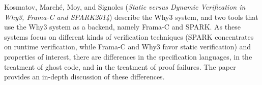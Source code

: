 

Kosmatov, March\'{e}, Moy, and Signoles
\cite{isola-2016-kosmatov}
({\em Static versus Dynamic Verification in 
      Why3, Frama-C and SPARK2014})
describe the Why3 system, and two tools that use the Why3 system as a
backend, namely Frama-C and SPARK. As these systems focus on different
kinds of verification techniques (SPARK concentrates on runtime
verification, while Frama-C and Why3 favor static verification) and
properties of interest, there are differences in the specification
languages, in the treatment of ghost code, and in the treatment of
proof failures. The paper provides an in-depth discussion of these differences.
